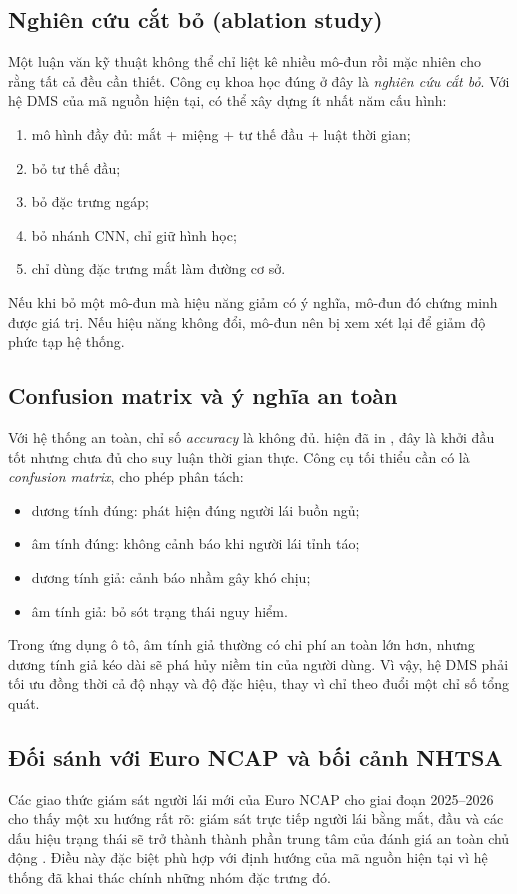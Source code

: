 \documentclass[12pt,a4paper]{article}
\begin{document}
\subsection{Nghiên cứu cắt bỏ (ablation study)}
Một luận văn kỹ thuật không thể chỉ liệt kê nhiều mô-đun rồi mặc nhiên cho rằng tất cả đều cần thiết. Công cụ khoa học đúng ở đây là \textit{nghiên cứu cắt bỏ}. Với hệ DMS của mã nguồn hiện tại, có thể xây dựng ít nhất năm cấu hình:
\begin{enumerate}[label=\arabic*.]
  \item mô hình đầy đủ: mắt + miệng + tư thế đầu + luật thời gian;
  \item bỏ tư thế đầu;
  \item bỏ đặc trưng ngáp;
  \item bỏ nhánh CNN, chỉ giữ hình học;
  \item chỉ dùng đặc trưng mắt làm đường cơ sở.
\end{enumerate}
Nếu khi bỏ một mô-đun mà hiệu năng giảm có ý nghĩa, mô-đun đó chứng minh được giá trị. Nếu hiệu năng không đổi, mô-đun nên bị xem xét lại để giảm độ phức tạp hệ thống.

\subsection{Confusion matrix và ý nghĩa an toàn}
Với hệ thống an toàn, chỉ số \textit{accuracy} là không đủ.  hiện đã in , đây là khởi đầu tốt nhưng chưa đủ cho suy luận thời gian thực. Công cụ tối thiểu cần có là \textit{confusion matrix}, cho phép phân tách:
\begin{itemize}
  \item dương tính đúng: phát hiện đúng người lái buồn ngủ;
  \item âm tính đúng: không cảnh báo khi người lái tỉnh táo;
  \item dương tính giả: cảnh báo nhầm gây khó chịu;
  \item âm tính giả: bỏ sót trạng thái nguy hiểm.
\end{itemize}
Trong ứng dụng ô tô, âm tính giả thường có chi phí an toàn lớn hơn, nhưng dương tính giả kéo dài sẽ phá hủy niềm tin của người dùng. Vì vậy, hệ DMS phải tối ưu đồng thời cả độ nhạy và độ đặc hiệu, thay vì chỉ theo đuổi một chỉ số tổng quát.

\subsection{Đối sánh với Euro NCAP và bối cảnh NHTSA}
Các giao thức giám sát người lái mới của Euro NCAP cho giai đoạn 2025--2026 cho thấy một xu hướng rất rõ: giám sát trực tiếp người lái bằng mắt, đầu và các dấu hiệu trạng thái sẽ trở thành thành phần trung tâm của đánh giá an toàn chủ động \cite{euroncap_driver_engagement,euroncapsd201,euroncapsd202}. Điều này đặc biệt phù hợp với định hướng của mã nguồn hiện tại vì hệ thống đã khai thác chính những nhóm đặc trưng đó.
\end{document}
